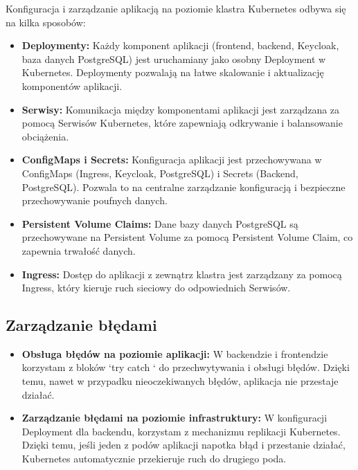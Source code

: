 \documentclass[12pt,a4paper]{article}
\begin{document}
Konfiguracja i zarządzanie aplikacją na poziomie klastra Kubernetes odbywa się na kilka sposobów:

\begin{itemize}
\item \textbf{Deploymenty:} Każdy komponent aplikacji (frontend, backend, Keycloak, baza danych PostgreSQL) jest uruchamiany jako osobny Deployment w Kubernetes. Deploymenty pozwalają na łatwe skalowanie i aktualizację komponentów aplikacji.

\item \textbf{Serwisy:} Komunikacja między komponentami aplikacji jest zarządzana za pomocą Serwisów Kubernetes, które zapewniają odkrywanie i balansowanie obciążenia.

\item \textbf{ConfigMaps i Secrets:} Konfiguracja aplikacji jest przechowywana w ConfigMaps (Ingress, Keycloak, PostgreSQL) i Secrets (Backend, PostgreSQL). Pozwala to na centralne zarządzanie konfiguracją i bezpieczne przechowywanie poufnych danych.

\item \textbf{Persistent Volume Claims:} Dane bazy danych PostgreSQL są przechowywane na Persistent Volume za pomocą Persistent Volume Claim, co zapewnia trwałość danych.

\item \textbf{Ingress:} Dostęp do aplikacji z zewnątrz klastra jest zarządzany za pomocą Ingress, który kieruje ruch sieciowy do odpowiednich Serwisów.
\end{itemize}

\subsection{Zarządzanie błędami}
\label{sec:ERD} 

\begin{itemize}
\item \textbf{Obsługa błędów na poziomie aplikacji:} W backendzie i frontendzie korzystam z bloków `try {} catch {}` do przechwytywania i obsługi błędów. Dzięki temu, nawet w przypadku nieoczekiwanych błędów, aplikacja nie przestaje działać.
\item \textbf{Zarządzanie błędami na poziomie infrastruktury:} W konfiguracji Deployment dla backendu, korzystam z mechanizmu replikacji Kubernetes. Dzięki temu, jeśli jeden z podów aplikacji napotka błąd i przestanie działać, Kubernetes automatycznie przekieruje ruch do drugiego poda.

\end{itemize}
\end{document}
